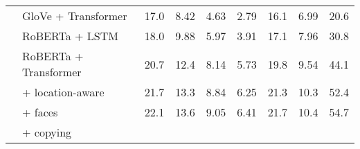 \begin{table*}[t]
\begin{tabularx}{\textwidth}{llXXXXXXX}
      & GloVe + Transformer & 17.0 & 8.42 & 4.63 & 2.79 & 16.1 & 6.99 & 20.6 \\ %
      & RoBERTa + LSTM & 18.0 & 9.88 & 5.97 & 3.91 & 17.1 & 7.96 & 30.8 \\ %
      & RoBERTa + Transformer & 20.7 & 12.4 & 8.14 & 5.73 & 19.8 & 9.54 & 44.1 \\ %
      & \quad + location-aware & 21.7 & 13.3 & 8.84 & 6.25 & 21.3 & 10.3 & 52.4 \\ %
      & \quad\quad + faces & 22.1 & 13.6 & 9.05 & 6.41 & 21.7 & 10.4 & 54.7 \\ %
      & \quad\quad\quad + copying \\
      \bottomrule
	\end{tabularx}
\end{table*}



